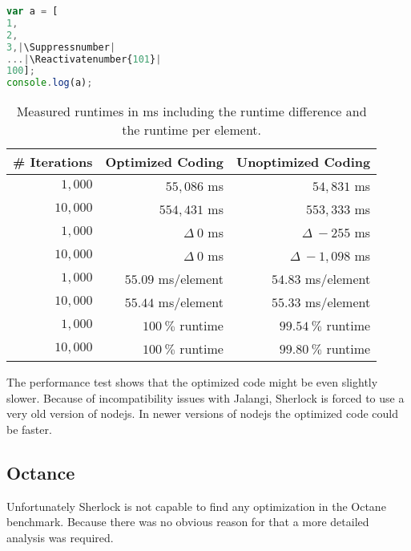 \begin{lstlisting}[caption=Optimized test coding,label=list:opt_js_test,language=JavaScript]
var a = [
1,
2,
3,|\Suppressnumber|
...|\Reactivatenumber{101}|
100];
console.log(a);
\end{lstlisting}

\begin{table}[h]
\begin{center}
\renewcommand{\thead}[1]{\multicolumn{1}{c}{\bfseries #1}}
\renewcommand{\arraystretch}{1.3}
\begin{tabular}[htbp]{r|r|r}
\thead{\# Iterations} & \thead{Optimized Coding} & \thead{Unoptimized Coding} \\
\hline $1,000$ & $55,086$ ms & $54,831$ ms \\
\hline $10,000$ & $554,431$ ms & $553,333$ ms \\
\hline\hline $1,000$ & $\Delta\ 0$ ms & $\Delta\ -255$ ms \\
\hline $10,000$ & $\Delta\ 0$ ms & $\Delta\ -1,098$ ms \\

\hline\hline $1,000$ & $55.09$ ms/element & $54.83$ ms/element \\
\hline $10,000$ & $55.44$ ms/element & $55.33$ ms/element  \\
\hline\hline $1,000$ & $100\ \%$ runtime & $99.54\ \%$ runtime \\
\hline $10,000$ & $100\ \%$ runtime & $99.80\ \%$ runtime \\ \hline
\end{tabular}
\end{center}
\caption{Measured runtimes in ms including the runtime difference and the runtime per element.}\label{tab:perf_results}
\end{table}

The performance test shows that the optimized code might be even slightly slower. Because of incompatibility issues with Jalangi, Sherlock is forced to use a very old version of nodejs. In newer versions of nodejs the optimized code could be faster.



\subsection{Octance}

Unfortunately Sherlock is not capable to find any optimization in the Octane benchmark. Because there was no obvious reason for that a more detailed analysis was required.

